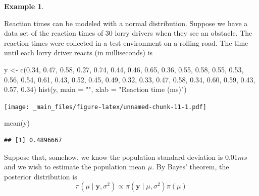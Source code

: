 \documentclass[
]{book}
\newenvironment{Shaded}{\begin{snugshade}}{\end{snugshade}}
\newcommand{\AttributeTok}[1]{\textcolor[rgb]{0.77,0.63,0.00}{#1}}
\newcommand{\FloatTok}[1]{\textcolor[rgb]{0.00,0.00,0.81}{#1}}
\newcommand{\FunctionTok}[1]{\textcolor[rgb]{0.00,0.00,0.00}{#1}}
\newcommand{\NormalTok}[1]{#1}
\newcommand{\OtherTok}[1]{\textcolor[rgb]{0.56,0.35,0.01}{#1}}
\newcommand{\StringTok}[1]{\textcolor[rgb]{0.31,0.60,0.02}{#1}}
\theoremstyle{definition}
\theoremstyle{definition}
\newtheorem{example}{Example}[chapter]
\theoremstyle{definition}
\theoremstyle{definition}
\theoremstyle{remark}
\begin{document}
\begin{example}
\protect\hypertarget{exm:normal}{}\label{exm:normal}

Reaction times can be modeled with a normal distribution. Suppose we have a data set of the reaction times of 30 lorry drivers when they see an obstacle. The reaction times were collected in a test environment on a rolling road. The time until each lorry driver reacts (in milliseconds) is

\begin{Shaded}
\begin{Highlighting}[]
\NormalTok{y }\OtherTok{\textless{}{-}} \FunctionTok{c}\NormalTok{(}\FloatTok{0.34}\NormalTok{, }\FloatTok{0.47}\NormalTok{, }\FloatTok{0.58}\NormalTok{, }\FloatTok{0.27}\NormalTok{, }\FloatTok{0.74}\NormalTok{, }\FloatTok{0.44}\NormalTok{, }\FloatTok{0.46}\NormalTok{, }\FloatTok{0.65}\NormalTok{, }\FloatTok{0.36}\NormalTok{, }\FloatTok{0.55}\NormalTok{, }\FloatTok{0.58}\NormalTok{, }\FloatTok{0.55}\NormalTok{, }\FloatTok{0.53}\NormalTok{, }\FloatTok{0.56}\NormalTok{, }\FloatTok{0.54}\NormalTok{, }\FloatTok{0.61}\NormalTok{, }\FloatTok{0.43}\NormalTok{, }\FloatTok{0.52}\NormalTok{, }\FloatTok{0.45}\NormalTok{, }\FloatTok{0.49}\NormalTok{, }\FloatTok{0.32}\NormalTok{, }\FloatTok{0.33}\NormalTok{, }\FloatTok{0.47}\NormalTok{, }\FloatTok{0.58}\NormalTok{, }\FloatTok{0.34}\NormalTok{, }\FloatTok{0.60}\NormalTok{, }\FloatTok{0.59}\NormalTok{, }\FloatTok{0.43}\NormalTok{, }\FloatTok{0.57}\NormalTok{, }\FloatTok{0.34}\NormalTok{)}
\FunctionTok{hist}\NormalTok{(y, }\AttributeTok{main =} \StringTok{""}\NormalTok{, }\AttributeTok{xlab =} \StringTok{"Reaction time (ms)"}\NormalTok{)}
\end{Highlighting}
\end{Shaded}

\texttt{[image: \_main\_files/figure-latex/unnamed-chunk-11-1.pdf]}

\begin{Shaded}
\begin{Highlighting}[]
\FunctionTok{mean}\NormalTok{(y)}
\end{Highlighting}
\end{Shaded}

\begin{verbatim}
## [1] 0.4896667
\end{verbatim}

Suppose that, somehow, we know the population standard deviation is 0.01\(ms\) and we wish to estimate the population mean \(\mu\). By Bayes' theorem, the posterior distribution is
\[
\pi(\mu \mid \boldsymbol{y}, \sigma^2) \propto \pi(\boldsymbol{y} \mid \mu, \sigma^2) \pi(\mu)
\]


\end{example}
\end{document}
